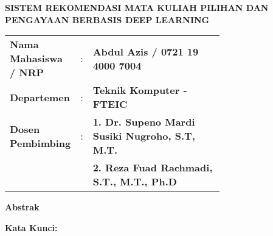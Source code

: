 \begin{center}
    \uppercase{\textbf{\large Sistem rekomendasi Mata Kuliah Pilihan dan Pengayaan berbasis Deep Learning}}
\end{center}

\vspace*{6 mm}
\begin{adjustwidth}{}{}
    \begin{tabular}{lcp{0.7\linewidth}}

        \noindent\textbf{Nama Mahasiswa / NRP} & : & \textbf{Abdul Azis / 0721 19 4000 7004}                \\
        \noindent\textbf{Departemen}           & : & \textbf{Teknik Komputer - FTEIC}                       \\
        \noindent\textbf{Dosen Pembimbing}     & : & \textbf{1. Dr. Supeno Mardi Susiki Nugroho, S.T, M.T.} \\
                                               &   & \textbf{2. Reza Fuad Rachmadi, S.T., M.T., Ph.D}       \\
    \end{tabular}
\end{adjustwidth}

\vspace{6 mm}
\noindent
\textbf{Abstrak}
\vspace{3 mm}

\lipsum[2-4]

\vspace{6 mm}
\noindent
\textbf{Kata Kunci: }



